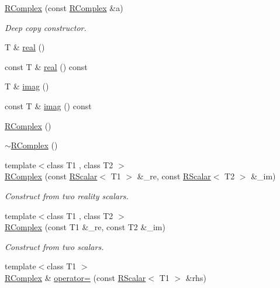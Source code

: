 \begin{DoxyCompactItemize}
\mbox{\hyperlink{classENSEM_1_1RComplex_acfff70ac44afad9aa6848f117f86b675}{R\+Complex}} (const \mbox{\hyperlink{classENSEM_1_1RComplex}{R\+Complex}} \&a)
\begin{DoxyCompactList}\small\item\em Deep copy constructor. \end{DoxyCompactList}\item 
T \& \mbox{\hyperlink{classENSEM_1_1RComplex_a1675e3defa774edeb1a7390bd14a86c8}{real}} ()
\item 
const T \& \mbox{\hyperlink{classENSEM_1_1RComplex_a0a055b8b16ef4c73ab5fb4e5ff93c7f1}{real}} () const
\item 
T \& \mbox{\hyperlink{classENSEM_1_1RComplex_af4f97cf18c025407a8e66f848252243d}{imag}} ()
\item 
const T \& \mbox{\hyperlink{classENSEM_1_1RComplex_a8df643a2ba06dc851d19eb35cd4c4cde}{imag}} () const
\item 
\mbox{\hyperlink{classENSEM_1_1RComplex_a5c5fc0c5c776dc45229f8702053962e5}{R\+Complex}} ()
\item 
\mbox{\hyperlink{classENSEM_1_1RComplex_a6e888c12c12f117dab2c0fd122b7b8d7}{$\sim$\+R\+Complex}} ()
\item 
{\footnotesize template$<$class T1 , class T2 $>$ }\\\mbox{\hyperlink{classENSEM_1_1RComplex_aec74e0e2dcf90ad4b575285662713b9c}{R\+Complex}} (const \mbox{\hyperlink{classENSEM_1_1RScalar}{R\+Scalar}}$<$ T1 $>$ \&\+\_\+re, const \mbox{\hyperlink{classENSEM_1_1RScalar}{R\+Scalar}}$<$ T2 $>$ \&\+\_\+im)
\begin{DoxyCompactList}\small\item\em Construct from two reality scalars. \end{DoxyCompactList}\item 
{\footnotesize template$<$class T1 , class T2 $>$ }\\\mbox{\hyperlink{classENSEM_1_1RComplex_aa67055e36f9e7d7709eb98453901b0ba}{R\+Complex}} (const T1 \&\+\_\+re, const T2 \&\+\_\+im)
\begin{DoxyCompactList}\small\item\em Construct from two scalars. \end{DoxyCompactList}\item 
{\footnotesize template$<$class T1 $>$ }\\\mbox{\hyperlink{classENSEM_1_1RComplex}{R\+Complex}} \& \mbox{\hyperlink{classENSEM_1_1RComplex_a6553ee6381e82a410c0c531fde8e3fee}{operator=}} (const \mbox{\hyperlink{classENSEM_1_1RScalar}{R\+Scalar}}$<$ T1 $>$ \&rhs)

\end{DoxyCompactItemize}

